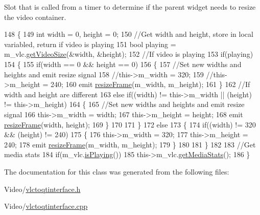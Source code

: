 Slot that is called from a timer to determine if the parent widget needs to resize the video container. 
\begin{DoxyCode}
148 \{
149     \textcolor{keywordtype}{int} width = 0, height = 0;
150     \textcolor{comment}{//Get width and height, store in local variabled, return if video is playing}
151     \textcolor{keywordtype}{bool} playing = m\_vlc.\hyperlink{classVLCWrapper_a806ad002020aaba2f471ee948226cb0c}{getVideoSize}(&width, &height);
152     \textcolor{comment}{//If video is playing}
153     \textcolor{keywordflow}{if}(playing)
154     \{
155         \textcolor{keywordflow}{if}(width == 0 && height == 0)
156         \{
157             \textcolor{comment}{//Set new widths and heights and emit resize signal}
158             \textcolor{comment}{//this->m\_width = 320;}
159             \textcolor{comment}{//this->m\_height = 240;}
160             emit \hyperlink{classVLCToQtInterface_aaf0ae5e8675efd6c039df97c4c24bd77}{resizeFrame}(m\_width, m\_height);
161         \}
162         \textcolor{comment}{//If width and height are different}
163         \textcolor{keywordflow}{else} \textcolor{keywordflow}{if}((width) != this->m\_width || (height) != this->m\_height)
164         \{
165             \textcolor{comment}{//Set new widths and heights and emit resize signal}
166             this->m\_width = width;
167             this->m\_height = height;
168             emit \hyperlink{classVLCToQtInterface_aaf0ae5e8675efd6c039df97c4c24bd77}{resizeFrame}(width, height);
169         \}
170 
171     \}
172     \textcolor{keywordflow}{else}
173     \{
174         \textcolor{keywordflow}{if}((width) != 320 && (height) != 240)
175         \{
176             this->m\_width = 320;
177             this->m\_height = 240;
178             emit \hyperlink{classVLCToQtInterface_aaf0ae5e8675efd6c039df97c4c24bd77}{resizeFrame}(m\_width, m\_height);
179         \}
180 
181     \}
182 
183     \textcolor{comment}{//Get media stats}
184     \textcolor{keywordflow}{if}(m\_vlc.\hyperlink{classVLCWrapper_a52d4cde1548105d10d1b8906fac68dac}{isPlaying}())
185         this->m\_vlc.\hyperlink{classVLCWrapper_a743fecb30b118eb999780cc4559eba86}{getMediaStats}();
186 \}
\end{DoxyCode}


The documentation for this class was generated from the following files\-:\begin{DoxyCompactItemize}
\item 
Video/\hyperlink{vlctoqtinterface_8h}{vlctoqtinterface.\-h}\item 
Video/\hyperlink{vlctoqtinterface_8cpp}{vlctoqtinterface.\-cpp}\end{DoxyCompactItemize}
